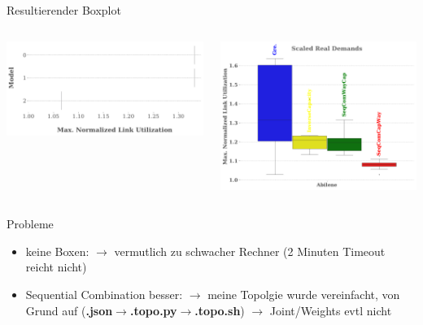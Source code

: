 \documentclass[aspectratio=169,10pt]{beamer}
\begin{document}
\begin{frame}{Resultierender Boxplot}

\begin{columns}
\begin{column}[t]{0.5\paperwidth}
\includegraphics[width=\textwidth]{images/pouria3.pdf}
\end{column}
\begin{column}[t]{0.5\paperwidth}
\includegraphics[width=\textwidth]{images/pouria_real_demands.pdf}
\end{column}
\end{columns}
\end{frame}
\begin{frame}{Probleme}
\Large
\begin{itemize}
    \item keine Boxen:\newline
    $\rightarrow$ vermutlich zu schwacher Rechner (2 Minuten Timeout reicht nicht)
    \item Sequential Combination besser:\newline
    $\rightarrow$ meine Topolgie wurde vereinfacht, von Grund auf (\textbf{.json}$\rightarrow$\textbf{.topo.py}$\rightarrow$\textbf{.topo.sh})\newline
    $\rightarrow$ Joint/Weights evtl nicht
\end{itemize}
\end{frame}
\end{document}
